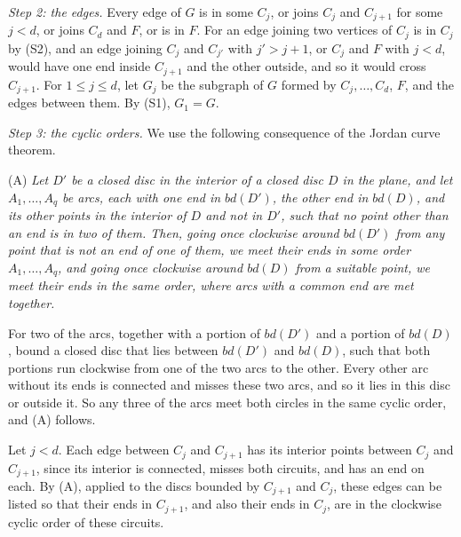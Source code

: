 {\textit{Step 2: the edges.} Every edge of $G$ is in some $C_j$, or joins $C_j$ and $C_{j+1}$ for some $j < d$, or joins $C_d$ and $F$, or is in $F$. For an edge joining two vertices of $C_j$ is in $C_j$ by (S2), and an edge joining $C_j$ and $C_{j'}$ with $j' > j + 1$, or $C_j$ and $F$ with $j < d$, would have one end inside $C_{j+1}$ and the other outside, and so it would cross $C_{j+1}$. For $1 \le j \le d$, let $G_j$ be the subgraph of $G$ formed by $C_j, \dots, C_d$, $F$, and the edges between them. By (S1), $G_1 = G$.

\textit{Step 3: the cyclic orders.} We use the following consequence of the Jordan curve theorem.

\hspace*{12pt}(A) \textit{Let $D'$ be a closed disc in the interior of a closed disc $D$ in the plane, and let $A_1, \dots, A_q$ be arcs, each with one end in $bd(D')$, the other end in $bd(D)$, and its other points in the interior of $D$ and not in $D'$, such that no point other than an end is in two of them. Then, going once clockwise around $bd(D')$ from any point that is not an end of one of them, we meet their ends in some order $A_1, \dots, A_q$, and going once clockwise around $bd(D)$ from a suitable point, we meet their ends in the same order, where arcs with a common end are met together.}

For two of the arcs, together with a portion of $bd(D')$ and a portion of $bd(D)$, bound a closed disc that lies between $bd(D')$ and $bd(D)$, such that both portions run clockwise from one of the two arcs to the other. Every other arc without its ends is connected and misses these two arcs, and so it lies in this disc or outside it. So any three of the arcs meet both circles in the same cyclic order, and (A) follows.

Let $j < d$. Each edge between $C_j$ and $C_{j+1}$ has its interior points between $C_j$ and $C_{j+1}$, since its interior is connected, misses both circuits, and has an end on each. By (A), applied to the discs bounded by $C_{j+1}$ and $C_j$, these edges can be listed so that their ends in $C_{j+1}$, and also their ends in $C_j$, are in the clockwise cyclic order of these circuits.

}
